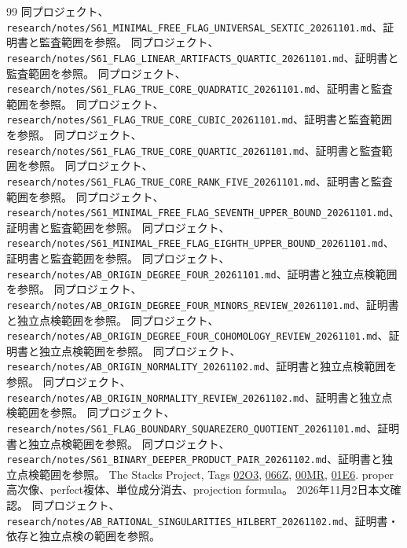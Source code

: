 \documentclass[11pt,a4paper]{ltjsarticle}
\theoremstyle{remark}
\begin{document}
\begin{thebibliography}{99}
 同プロジェクト、\nolinkurl{research/notes/S61_MINIMAL_FREE_FLAG_UNIVERSAL_SEXTIC_20261101.md}、証明書と監査範囲を参照。
 同プロジェクト、\nolinkurl{research/notes/S61_FLAG_LINEAR_ARTIFACTS_QUARTIC_20261101.md}、証明書と監査範囲を参照。
 同プロジェクト、\nolinkurl{research/notes/S61_FLAG_TRUE_CORE_QUADRATIC_20261101.md}、証明書と監査範囲を参照。
 同プロジェクト、\nolinkurl{research/notes/S61_FLAG_TRUE_CORE_CUBIC_20261101.md}、証明書と監査範囲を参照。
 同プロジェクト、\nolinkurl{research/notes/S61_FLAG_TRUE_CORE_QUARTIC_20261101.md}、証明書と監査範囲を参照。
 同プロジェクト、\nolinkurl{research/notes/S61_FLAG_TRUE_CORE_RANK_FIVE_20261101.md}、証明書と監査範囲を参照。
 同プロジェクト、\nolinkurl{research/notes/S61_MINIMAL_FREE_FLAG_SEVENTH_UPPER_BOUND_20261101.md}、証明書と監査範囲を参照。
 同プロジェクト、\nolinkurl{research/notes/S61_MINIMAL_FREE_FLAG_EIGHTH_UPPER_BOUND_20261101.md}、証明書と監査範囲を参照。
 同プロジェクト、\nolinkurl{research/notes/AB_ORIGIN_DEGREE_FOUR_20261101.md}、証明書と独立点検範囲を参照。
 同プロジェクト、\nolinkurl{research/notes/AB_ORIGIN_DEGREE_FOUR_MINORS_REVIEW_20261101.md}、証明書と独立点検範囲を参照。
 同プロジェクト、\nolinkurl{research/notes/AB_ORIGIN_DEGREE_FOUR_COHOMOLOGY_REVIEW_20261101.md}、証明書と独立点検範囲を参照。
 同プロジェクト、\nolinkurl{research/notes/AB_ORIGIN_NORMALITY_20261102.md}、証明書と独立点検範囲を参照。
 同プロジェクト、\nolinkurl{research/notes/AB_ORIGIN_NORMALITY_REVIEW_20261102.md}、証明書と独立点検範囲を参照。
 同プロジェクト、\nolinkurl{research/notes/S61_FLAG_BOUNDARY_SQUAREZERO_QUOTIENT_20261101.md}、証明書と独立点検範囲を参照。
 同プロジェクト、\nolinkurl{research/notes/S61_BINARY_DEEPER_PRODUCT_PAIR_20261102.md}、証明書と独立点検範囲を参照。
 The Stacks Project, Tags
\href{https://stacks.math.columbia.edu/tag/02O3}{02O3},
\href{https://stacks.math.columbia.edu/tag/066Z}{066Z},
\href{https://stacks.math.columbia.edu/tag/00MR}{00MR},
\href{https://stacks.math.columbia.edu/tag/01E6}{01E6}.
proper高次像、perfect複体、単位成分消去、projection formula。
2026年11月2日本文確認。
 同プロジェクト、\nolinkurl{research/notes/AB_RATIONAL_SINGULARITIES_HILBERT_20261102.md}、証明書・依存と独立点検の範囲を参照。

\end{thebibliography}
\end{document}
